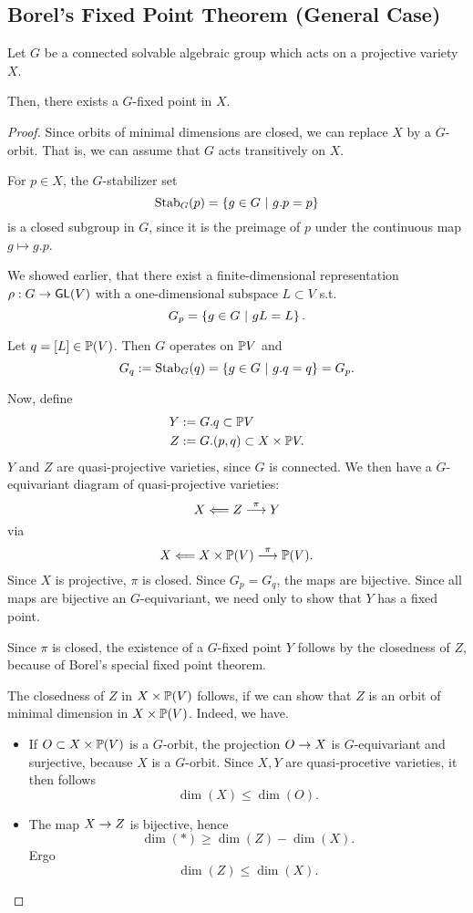 \subsection{Borel's Fixed Point Theorem (General Case)}

\begin{theorem}
	Let $G$ be a connected solvable algebraic group which acts on a projective variety $X$.
	
	Then, there exists a $G$-fixed point in $X$.
\end{theorem}
\begin{proof}
	Since orbits of minimal dimensions are closed, we can replace $X$ by a $G$-orbit. That is, we can assume that $G$ acts transitively on $X$.
	
	For $p \in X$, the $G$-stabilizer set
	\[ \mathrm{Stab}_G(p) = \set{g \in G}{g.p = p} \]
	is a closed subgroup in $G$, since it is the preimage of $p$ under the continuous map $g\mapsto g.p$.
	
	We showed earlier, that there exist a finite-dimensional representation $\rho : G \pfeil{} \GL(V)$ with a one-dimensional subspace $L \subset V$ s.t.
	\[ G_p = \set{ g \in G}{gL = L}. \]
	
	Let $q = [L] \in \P(V)$. Then $G$ operates on $\P V$ and
	\[ G_q := \mathrm{Stab}_G(q) = \set{g \in G}{g.q = q} = G_p.\]
	
	Now, define
	\begin{align*}
	Y &:= G.q \subset \P V\\
	Z&:= G.(p,q) \subset X \times \P V.
	\end{align*}
	$Y$ and $Z$ are quasi-projective varieties, since $G$ is connected. We then have a $G$-equivariant diagram of quasi-projective varieties:
	\[ X \Longleftarrow Z \Pfeil{\pi} Y \]
	via
	\[ X \Longleftarrow X \times \P(V) \Pfeil{\pi} \P(V). \]
	Since $X$ is projective, $\pi$ is closed. Since $G_p = G_q$, the maps are bijective.
	Since all maps are bijective an $G$-equivariant, we need only to show that $Y$ has a fixed point.
	
	Since $\pi$ is closed, the existence of a $G$-fixed point $Y$ follows by the closedness of $Z$, because of Borel's special fixed point theorem.
	
	The closedness of $Z$ in $X \times \P(V)$ follows, if we can show that $Z$ is an orbit of minimal dimension in $X\times \P(V)$.
	Indeed, we have.
	\begin{itemize}
		\item If $O \subset X \times \P(V)$ is a $G$-orbit, the projection $O \pfeil{} X$  is $G$-equivariant and surjective, because $X$ is a $G$-orbit. Since $X,Y$ are quasi-procetive varieties, it then follows
		\[ \dim(X) \leq \dim(O). \]
		\item The map $X \pfeil{} Z$ is bijective, hence
		\[ \dim(*) \geq \dim(Z) - \dim (X). \]
		Ergo
		\[ \dim(Z) \leq \dim(X). \]
	\end{itemize}
\end{proof}
